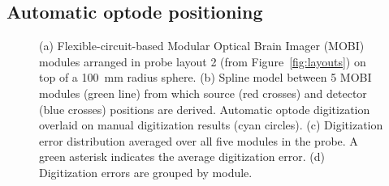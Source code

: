 \subsection{Automatic optode positioning}
\begin{figure}
	\begin{center}
	\end{center}
	\caption{(a) Flexible-circuit-based Modular Optical Brain Imager (MOBI) modules arranged in probe layout 2 (from Figure~\ref{fig:layouts}) on top of a 100~mm radius sphere. (b) Spline model between 5 MOBI modules (green line) from which source (red crosses) and detector (blue crosses) positions are derived. Automatic optode digitization overlaid on manual digitization results (cyan circles). (c) Digitization error distribution averaged over all five modules in the probe. A green asterisk indicates the average digitization error. (d) Digitization errors are grouped by module.} 
	\label{fig:digitization}
\end{figure} 
